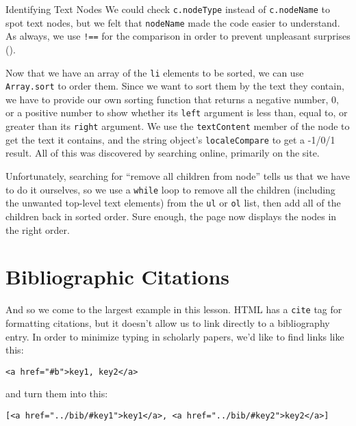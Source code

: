 \begin{aside}{Identifying Text Nodes}
  We could check \texttt{c.nodeType} instead of \texttt{c.nodeName} to spot text nodes,
  but we felt that \texttt{nodeName} made the code easier to understand.
  As always,
  we use \texttt{!==} for the comparison
  in order to prevent unpleasant surprises ().
\end{aside}

Now that we have an array of the \texttt{li} elements to be sorted,
we can use \texttt{Array.sort} to order them.
Since we want to sort them by the text they contain,
we have to provide our own sorting function
that returns a negative number, 0, or a positive number to show whether its \texttt{left} argument is less than,
equal to,
or greater than its \texttt{right} argument.
We use the \texttt{textContent} member of the node to get the text it contains,
and the string object's \texttt{localeCompare} to get a -1/0/1 result.
All of this was discovered by searching online,
primarily on the  site.

Unfortunately,
searching for ``remove all children from node'' tells us that we have to do it ourselves,
so we use a \texttt{while} loop to remove all the children
(including the unwanted top-level text elements)
from the \texttt{ul} or \texttt{ol} list,
then add all of the children back in sorted order.
Sure enough,
the page now displays the nodes in the right order.

\section{Bibliographic Citations}\label{s:pages-citations}

And so we come to the largest example in this lesson.
HTML has a \texttt{cite} tag for formatting citations,
but it doesn't allow us to link directly to a bibliography entry.
In order to minimize typing in scholarly papers,
we'd like to find links like this:

\begin{verbatim}
<a href="#b">key1, key2</a>
\end{verbatim}

\noindent
and turn them into this:

\begin{verbatim}
[<a href="../bib/#key1">key1</a>, <a href="../bib/#key2">key2</a>]
\end{verbatim}

